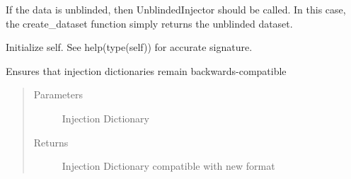 \documentclass[letterpaper,10pt,english]{sphinxmanual}
\begin{document}
\begin{fulllineitems}
\label{\detokenize{index:flarestack.core.injector.TrueUnblindedInjector}}
If the data is unblinded, then UnblindedInjector should be called. In
this case, the create\_dataset function simply returns the unblinded dataset.

\begin{fulllineitems}
\label{\detokenize{index:flarestack.core.injector.TrueUnblindedInjector.__init__}}
Initialize self.  See help(type(self)) for accurate signature.

\end{fulllineitems}


\begin{fulllineitems}
\label{\detokenize{index:flarestack.core.injector.TrueUnblindedInjector.create_dataset}}
\end{fulllineitems}


\end{fulllineitems}


\begin{fulllineitems}
\label{\detokenize{index:flarestack.core.injector.read_injector_dict}}
Ensures that injection dictionaries remain backwards-compatible
\begin{quote}\begin{description}
\item[{Parameters}] \leavevmode
{} \textendash{} Injection Dictionary

\item[{Returns}] \leavevmode
Injection Dictionary compatible with new format

\end{description}\end{quote}

\end{fulllineitems}
\end{document}
